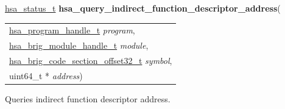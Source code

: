 \documentclass[final]{book}
\newcommand{\hsaarg}[1]{\textit{#1}}
\begin{document}
\begin{appendices}
\noindent\begin{tcolorbox}[breakable,nobeforeafter,colframe=white,colback=lightgray,left=0mm]
\hyperlink{group--status-1gad755322e7ff95456520e8abdbe90d225}{hsa_status_t} \hypertarget{group--HsailLinkerServiceLayer-1gace28133a4702c095dd5c1af67613e92a}{\textbf{hsa_query_indirect_function_descriptor_address}}(
\vspace{-3.5mm}\begin{longtable}{@{}p{\textwidth}}
\hspace{1.7em}\hyperlink{group--HsailLinkerServiceLayer-1ga7b28ca39da981be49aac99608eb386cb}{hsa_program_handle_t} \hsaarg{program},\\
\hspace{1.7em}\hyperlink{group--FinalizerCoreApi-1gafaea8b9ab368c499b58375f02f4b178b}{hsa_brig_module_handle_t} \hsaarg{module},\\
\hspace{1.7em}\hyperlink{group--FinalizerCoreApi-1ga975ce5cee53438ed8dc078f3e1dfbc04}{hsa_brig_code_section_offset32_t} \hsaarg{symbol},\\
\hspace{1.7em}uint64_t * \hsaarg{address})\end{longtable}

\end{tcolorbox}
Queries indirect function descriptor address.


\end{appendices}
\end{document}
